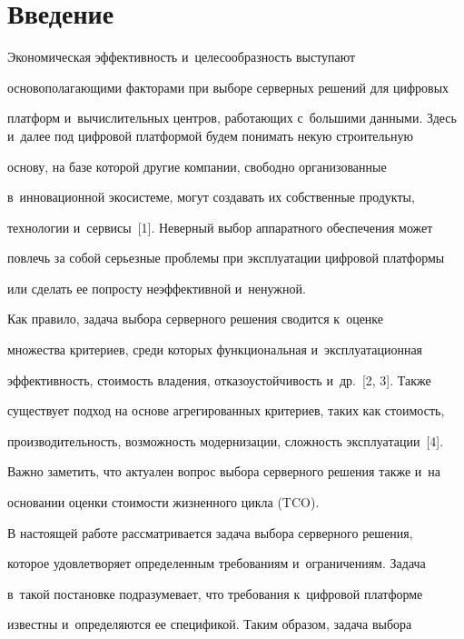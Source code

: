 \section{Введение}



\vspace*{-2pt}



    Экономическая эффективность и~це\-ле\-со\-об\-раз\-ность выступают 

основополагающими факторами при выборе серверных решений для циф\-ро\-вых 

платформ и~вычислительных центров, ра\-бо\-та\-ющих с~большими данными. Здесь и~далее под цифровой платформой будем понимать некую строительную 

основу, на базе которой другие компании, свободно организованные 

в~инновационной экосистеме, могут создавать их собственные продукты, 

технологии и~сервисы~[1]. Неверный выбор аппаратного обеспечения может 

повлечь за собой серьезные проб\-ле\-мы при эксплуатации цифровой платформы 

или сделать ее попросту неэффективной и~ненужной. 

    

    Как правило, задача выбора серверного решения сводится к~оценке 

множества критериев, среди которых функциональная и~эксплуатационная 

эффективность, стоимость владения, отказоустойчивость и~др.~[2, 3]. Также 

существует подход на основе агрегированных критериев, таких как стоимость, 

про\-из\-во\-ди\-тель\-ность, воз\-мож\-ность модернизации, слож\-ность эксплуатации~[4]. 

Важно заметить, что актуален вопрос выбора серверного решения также и~на 

основании оценки стоимости жизненного цикла (TCO). 

    

    В настоящей работе рассматривается задача выбора серверного решения, 

которое удовлетворяет определенным требованиям и~ограничениям. Задача 

в~такой постановке подразумевает, что требования к~циф\-ро\-вой платформе 

известны и~определяются ее спецификой. Таким образом, задача выбора 

